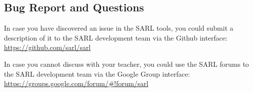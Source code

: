 \subsection{Bug Report and Questions}

In case you have discovered an issue in the SARL tools, you could submit a description of it to the SARL development team via the Github interface:\\
\url{https://github.com/sarl/sarl}

In case you cannot discuss with your teacher, you could use the SARL forums to the SARL development team via the Google Group interface:\\
\url{https://groups.google.com/forum/#!forum/sarl}

